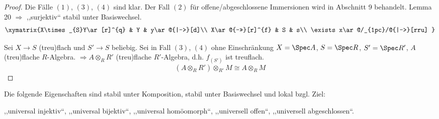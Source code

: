 \begin{proof}
  Die Fälle $(1)$, $(3)$, $(4)$ sind klar. Der Fall $(2)$ für offene/abgeschlossene
  Immersionen wird in Abschnitt 9 behandelt. Lemma 20 $\Longrightarrow$
  ,,surjektiv`` stabil unter Basiswechsel.
  \[
    \xymatrix{X\times_{S}Y\ar[r]^{q} & Y & y\ar@{|->}[d]\\
      X\ar@{->>}[r]^{f} & S & s\\
      \exists x\ar@/_{1pc}/@{|->}[rru]
    }
  \]

  Sei $X\rightarrow S$ (treu)flach und $S'\rightarrow S$ beliebig.
  Sei in Fall $(3)$, $(4)$ ohne Einschränkung $X=\Spec A$, $S=\Spec R$,
  $S'=\Spec R'$, $A$ (treu)flache $R$-Algebra. $\Longrightarrow A\otimes_{R}R'$
  (treu)flache $R'$-Algebra, d.h. $f_{(S')}$ ist treuflach.
  \[
    (A\otimes_{R}R')\otimes_{R'}M\cong A\otimes_{R}M
  \]
\end{proof}
\begin{cor}[23]
  Die folgende Eigenschaften sind stabil unter Komposition, stabil
  unter Basiswechsel und lokal bzgl. Ziel:

  ,,universal injektiv``, ,,universal bijektiv``, ,,universal homöomorph``,
  ,,universell offen``, ,,universell abgeschlossen``.
\end{cor}
